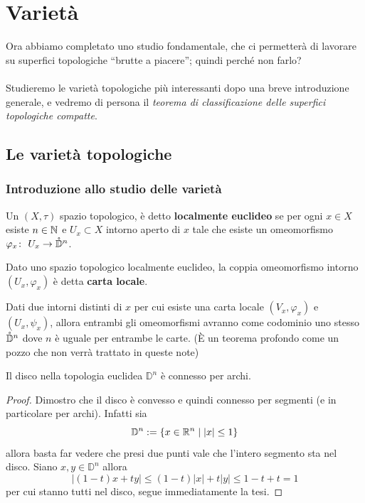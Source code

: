 \chapter{Varietà}
Ora abbiamo completato uno studio fondamentale, che ci permetterà di lavorare su superfici topologiche \enquote{brutte a piacere}; quindi perché non farlo? \\ \\ Studieremo le varietà topologiche più interessanti dopo una breve introduzione generale, e vedremo di persona il \textit{teorema di classificazione delle superfici topologiche compatte}.

\newpage
\section{Le varietà topologiche}
\subsection{\textcolor{TopAlg}{\textbf{Introduzione allo studio delle varietà}}}

\begin{definition}
	Un $(X,\tau)$ spazio topologico, è detto \textbf{localmente euclideo} se per ogni $x \in X$ esiste $n \in \mathbb{N}$ e $U_x \subset X$ intorno aperto di $x$ tale che esiste un omeomorfismo $\varphi_x \colon\ U_x \rightarrow \mathring{\mathbb{D}}^n$.  
\end{definition}

\begin{definition}
	Dato uno spazio topologico localmente euclideo, la coppia omeomorfismo intorno $(U_x, \varphi_x)$ è detta \textbf{carta locale}.
\end{definition}

\begin{remark}
	Dati due intorni distinti di $x$ per cui esiste una carta locale $(V_x, \varphi_x)$ e $(U_x, \psi_x)$, allora entrambi gli omeomorfismi avranno come codominio uno stesso $\mathring{\mathbb{D}}^n$ dove $n$ è uguale per entrambe le carte. (È un teorema profondo come un pozzo che non verrà trattato in queste note)
\end{remark}

\begin{theorem}
	Il disco nella topologia euclidea $\mathbb{D}^n$ è connesso per archi. 
\end{theorem} 
\begin{proof}
	Dimostro che il disco è convesso e quindi connesso per segmenti (e in particolare per archi). Infatti sia 
	\begin{equation}
	\mathbb{D}^n := \{x\in \mathbb{R}^n\; |\; |x| \le 1\}
	\end{equation}
	allora basta far vedere che presi due punti vale che l'intero segmento sta nel disco. Siano $x, y \in \mathbb{D}^n$ allora
	\begin{equation}
	|(1-t)x+ty| \le (1-t)|x| + t|y| \le 1-t+t =1
	\end{equation}
	per cui stanno tutti nel disco, segue immediatamente la tesi. 
\end{proof}


